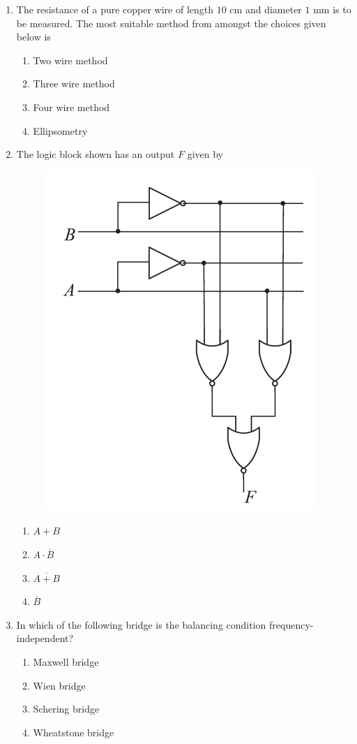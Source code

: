 \documentclass[journal,12pt,onecolumn]{IEEEtran}
\theoremstyle{remark}
\begin{document}
\begin{enumerate}
\item The resistance of a pure copper wire of length $10$ cm and diameter $1$ mm is to be measured. The most suitable method from amongst the choices given below is \underline{\hspace{2cm}}

\hfill{}
\begin{enumerate}
\item Two wire method
\item Three wire method
\item Four wire method
\item Ellipsometry
\end{enumerate}

\item The logic block shown has an output $F$ given by \underline{\hspace{2cm}}

\hfill{}
\begin{figure}[H]
\includegraphics[width = 0.5\columnwidth]{q21}
\caption*{}
\label{fig:q21}
\end{figure}
\begin{enumerate}
\item $A + B$
\item $A \cdot \overline{B}$
\item $\overline{A + B}$
\item $\overline{B}$
\end{enumerate}

\item In which of the following bridge is the balancing condition frequency-independent?

\hfill{}
\begin{enumerate}
\item Maxwell bridge
\item Wien bridge
\item Schering bridge
\item Wheatstone bridge
\end{enumerate}


\end{enumerate}
\end{document}
